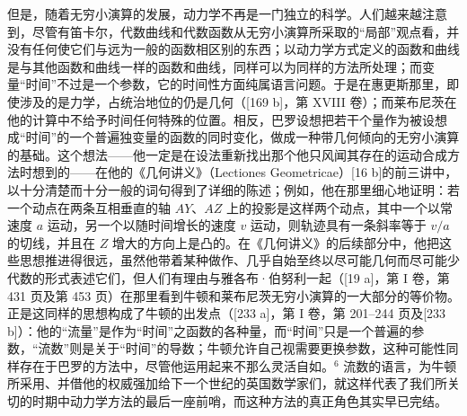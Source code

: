 \begin{enumerate}
\end{enumerate}

但是，随着无穷小演算的发展，动力学不再是一门独立的科学。人们越来越注意到，尽管有笛卡尔，代数曲线和代数函数从无穷小演算所采取的“局部”观点看，并没有任何使它们与远为一般的函数相区别的东西；以动力学方式定义的函数和曲线是与其他函数和曲线一样的函数和曲线，同样可以为同样的方法所处理；而变量“时间”不过是一个参数，它的时间性方面纯属语言问题。于是在惠更斯那里，即使涉及的是力学，占统治地位的仍是几何（{[}169 b{]}，第 XVIII 卷）；而莱布尼茨在他的计算中不给予时间任何特殊的位置。相反，巴罗设想把若干个量作为被设想成“时间”的一个普遍独变量的函数的同时变化，做成一种带几何倾向的无穷小演算的基础。这个想法——他一定是在设法重新找出那个他只风闻其存在的运动合成方法时想到的——在他的《几何讲义》（Lectiones Geometricae）{[}16 b{]}的前三讲中，以十分清楚而十分一般的词句得到了详细的陈述；例如，他在那里细心地证明：若一个动点在两条互相垂直的轴 \(AY\)、\(AZ\) 上的投影是这样两个动点，其中一个以常速度 \(a\) 运动，另一个以随时间增长的速度 \(v\) 运动，则轨迹具有一条斜率等于 \(v/a\) 的切线，并且在 \(Z\) 增大的方向上是凸的。在《几何讲义》的后续部分中，他把这些思想推进得很远，虽然他带着某种做作、几乎自始至终以尽可能几何而尽可能少代数的形式表述它们，但人们有理由与雅各布·伯努利一起（{[}19 a{]}，第 I 卷，第 431 页及第 453 页）在那里看到牛顿和莱布尼茨无穷小演算的一大部分的等价物。正是这同样的思想构成了牛顿的出发点（{[}233 a{]}，第 I 卷，第 201–244 页及{[}233 b{]}）：他的“流量”是作为“时间”之函数的各种量，而“时间”只是一个普遍的参数，“流数”则是关于“时间”的导数；牛顿允许自己视需要更换参数，这种可能性同样存在于巴罗的方法中，尽管他运用起来不那么灵活自如。\(^{6}\) 流数的语言，为牛顿所采用、并借他的权威强加给下一个世纪的英国数学家们，就这样代表了我们所关切的时期中动力学方法的最后一座前哨，而这种方法的真正角色其实早已完结。

